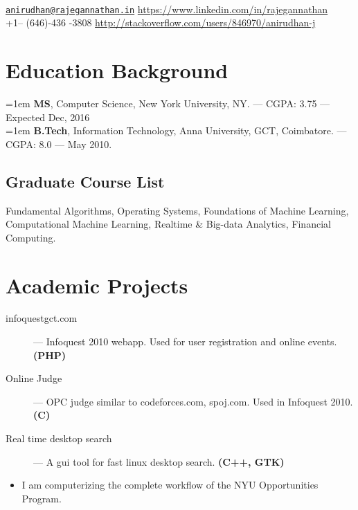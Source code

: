 \documentclass{resume}
\begin{document}
\\
{\href{mailto:anirudhan@rajegannathan.in}{\nolinkurl{anirudhan@rajegannathan.in}} \hfill \url{https://www.linkedin.com/in/rajegannathan}}\\
{+1-- (646)-436 -3808 \hfill \url{http://stackoverflow.com/users/846970/anirudhan-j}}

\section{Education Background}
\noindent \hangindent=1em  \textbf{MS}, Computer Science, New York University, NY\@. --- CGPA\@: 3.75 --- Expected Dec, 2016\\
\noindent \hangindent=1em  \textbf{B.Tech}, Information Technology, Anna University, GCT, Coimbatore. --- CGPA\@: 8.0 --- May 2010.

\subsection{Graduate Course List}
Fundamental Algorithms, Operating Systems, Foundations of Machine Learning, Computational Machine Learning, Realtime \& Big-data Analytics, Financial Computing.

\section{Academic Projects}
\begin{description}
  \item[infoquestgct.com] --- Infoquest 2010 webapp.  Used for user registration and online events. \textbf{(PHP)}
  \item[Online Judge] --- OPC judge similar to codeforces.com, spoj.com.  Used in Infoquest 2010. \textbf{(C)}
  \item[Real time desktop search] --- A gui tool for fast linux desktop search.  \textbf{(C++, GTK)}
\end{description}

\begin{itemize} \itemsep1pt \parskip0pt
  \item I am computerizing the complete workflow of the NYU Opportunities Program.
\end{itemize}
\end{document}
